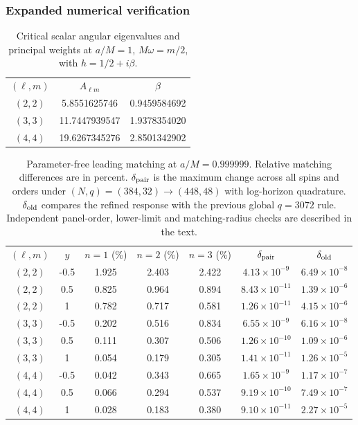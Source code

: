 \documentclass[aps,prd,twocolumn,10pt,nofootinbib,superscriptaddress,floatfix]{revtex4-2}
\begin{document}
\subsubsection{Expanded numerical verification}

\begin{table}[t]
\caption{Critical scalar angular eigenvalues and principal weights at
$a/M=1$, $M\omega=m/2$, with $h=1/2+i\beta$.}
\label{tab:principal-weights20261014}
\begin{ruledtabular}\begin{tabular}{ccc}
$(\ell,m)$ & $A_{\ell m}$ & $\beta$\\
$(2,2)$ & 5.8551625746 & 0.9459584692 \\
$(3,3)$ & 11.7447939547 & 1.9378354020 \\
$(4,4)$ & 19.6267345276 & 2.8501342902 \\
\end{tabular}\end{ruledtabular}\end{table}
\begin{table}[t]
\caption{Parameter-free leading matching at $a/M=0.999999$.
Relative matching differences are in percent. $\delta_{\rm pair}$ is the
maximum change across all spins and orders under $(N,q)=(384,32)\to(448,48)$
with log-horizon quadrature. $\delta_{\rm old}$ compares the refined response
with the previous global $q=3072$ rule. Independent panel-order,
lower-limit and matching-radius checks are described in the text.}
\label{tab:principal-verification20261014}
\begin{ruledtabular}\begin{tabular}{ccccccc}
$(\ell,m)$ & $y$ & $n=1$ (\%) & $n=2$ (\%) & $n=3$ (\%) & $\delta_{\rm pair}$ & $\delta_{\rm old}$\\
$(2,2)$ & -0.5 & 1.925 & 2.403 & 2.422 & $4.13\times10^{-9}$ & $6.49\times10^{-8}$\\
$(2,2)$ & 0.5 & 0.825 & 0.964 & 0.894 & $8.43\times10^{-11}$ & $1.39\times10^{-6}$\\
$(2,2)$ & 1 & 0.782 & 0.717 & 0.581 & $1.26\times10^{-11}$ & $4.15\times10^{-6}$\\
$(3,3)$ & -0.5 & 0.202 & 0.516 & 0.834 & $6.55\times10^{-9}$ & $6.16\times10^{-8}$\\
$(3,3)$ & 0.5 & 0.111 & 0.307 & 0.506 & $1.26\times10^{-10}$ & $1.09\times10^{-6}$\\
$(3,3)$ & 1 & 0.054 & 0.179 & 0.305 & $1.41\times10^{-11}$ & $1.26\times10^{-5}$\\
$(4,4)$ & -0.5 & 0.042 & 0.343 & 0.665 & $1.65\times10^{-9}$ & $1.17\times10^{-7}$\\
$(4,4)$ & 0.5 & 0.066 & 0.294 & 0.537 & $9.19\times10^{-10}$ & $7.49\times10^{-7}$\\
$(4,4)$ & 1 & 0.028 & 0.183 & 0.380 & $9.10\times10^{-11}$ & $2.27\times10^{-5}$\\
\end{tabular}\end{ruledtabular}\end{table}
\end{document}
